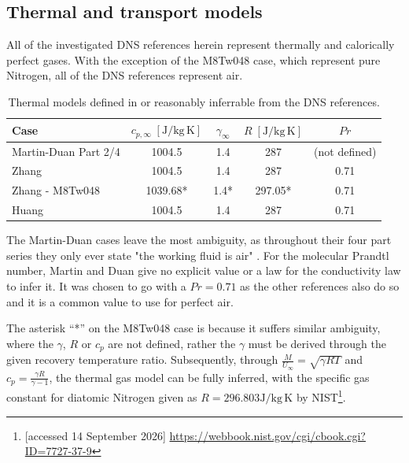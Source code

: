 \subsection{Thermal and transport models}

All of the investigated DNS references herein represent thermally and calorically perfect gases. With the exception of the M8Tw048 case, which represent pure Nitrogen, all of the DNS references represent air.

\begin{table}[H]
    \centering
    \caption{Thermal models defined in or reasonably inferrable from the DNS references.}
    \label{tab:evaluation:thermal-models}
    \begin{tabular}{l S[table-format=4.2,table-space-text-post={*},table-align-text-after=false] S[table-format=1.1,table-space-text-post={*},table-align-text-after=false] S[table-format=3.2,table-space-text-post={*},table-align-text-after=false] S[table-format=1.2]}
        \toprule
        Case & {\(c_{p,\infty}\;[\mathrm{J}/\mathrm{kg\,K}]\)} & {\(\gamma_\infty\)} & {\(R\;[\mathrm{J}/\mathrm{kg\,K}]\)} & {\(Pr\)} \\
        \midrule
        Martin-Duan Part 2/4 & 1004.5 & 1.4 & 287 & {(not defined)} \\
        Zhang & 1004.5 & 1.4 & 287 & 0.71 \\
        Zhang - M8Tw048 & 1039.68{*} & 1.4{*} & 297.05{*} & 0.71 \\
        Huang & 1004.5 & 1.4 & 287 & 0.71 \\
        \bottomrule
    \end{tabular}
\end{table}

The Martin-Duan cases leave the most ambiguity, as throughout their four part series they only ever state "the working fluid is air" \cite[p. 422]{duan2010direct_part2}. For the molecular Prandtl number, Martin and Duan give no explicit value or a law for the conductivity law to infer it. It was chosen to go with a \(Pr = 0.71\) as the other references also do so and it is a common value to use for perfect air.
\par\medskip

The asterisk ``*'' on the M8Tw048 case is because it suffers similar ambiguity, where the \(\gamma\), \(R\) or \(c_p\) are not defined, rather the \(\gamma \) must be derived through the given recovery temperature ratio. Subsequently, through \(\frac{M}{U_\infty} = \sqrt{\gamma R T}\) and \(c_p = \frac{\gamma R}{\gamma - 1}\), the thermal gas model can be fully inferred, with the specific gas constant for diatomic Nitrogen given as \(R = 296.803 \mathrm{J}/\mathrm{kg\,K}\) by NIST\footnote{[accessed 14 September 2026] \url{https://webbook.nist.gov/cgi/cbook.cgi?ID=7727-37-9}}.


